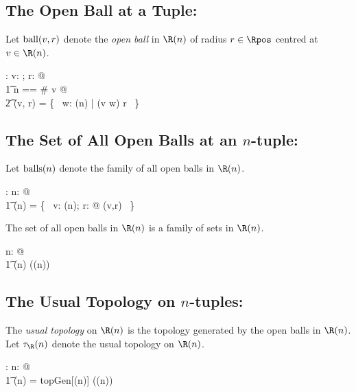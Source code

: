 \documentclass{amsart}
\begin{document}
\subsection{The Open Ball at a Tuple: }

Let $\operatorname{ball}(v,r)$ denote the \textit{open ball} in $\Rtup(n)$ of radius $r  \in \Rpos$ centred at $v \in \Rtup(n)$.

\begin{axdef}
\ballRinf: \Rinf \cross \Rpos \fun \power \Rinf
\where
\forall v: \Rinf; r: \Rpos @ \\
\t1	\LET n == \# v @ \\
\t2		\ballRinf(v, r) = \{~ w: \Rtup(n) | \normRinf(v \subRinf w) \ltR r ~\}
\end{axdef}

\subsection{The Set of All Open Balls at an $n$-tuple: }

Let $\operatorname{balls}(n)$ denote the family of all open balls in $\Rtup(n)$.

\begin{axdef}
	\ballsRtup: \nat \fun \Fam \Rinf
\where
	\forall n: \nat @ \\
	\t1	\ballsRtup(n) =  \{~ v: \Rtup(n); r: \Rpos @ \ballRinf(v,r) ~\}
\end{axdef}

\begin{remark}
The set of all open balls in $\Rtup(n)$ is a family of sets in $\Rtup(n)$.

\begin{zed}
\forall n: \nat @ \\
\t1	\ballsRtup(n) \in \Fam (\Rtup(n))
\end{zed}

\end{remark}

\subsection{The Usual Topology on $n$-tuples: }

The \textit{usual topology} on $\Rtup(n)$ is the topology generated by the open balls in $\Rtup(n)$.
Let $\tauRtup(n)$ denote the usual topology on $\Rtup(n)$.

\begin{axdef}
	\tauRtup: \nat \fun \Fam \Rinf
\where
	\forall n: \nat @ \\
	\t1	\tauRtup(n) = topGen[\Rtup(n)] (\ballsRtup(n))
\end{axdef}
\end{document}
